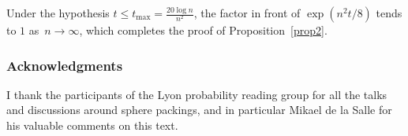 \documentclass[12pt]{amsart}
\renewcommand{\leq}{\leqslant}
\theoremstyle{plain}
\theoremstyle{remark}
\begin{document}
Under the hypothesis $t \leq t_{\max} = \frac{20 \log n}{n^2}$, the factor in front of $\exp(n^2t/8)$ tends to $1$ as~$n \to \infty$, which completes the proof of Proposition~\ref{prop2}.
 
\subsubsection*{Acknowledgments}
 
I thank the participants of the Lyon probability reading group for all the talks and discussions around sphere packings, and in particular Mikael de la Salle for his valuable comments on this text.
 

 
 
\end{document}
